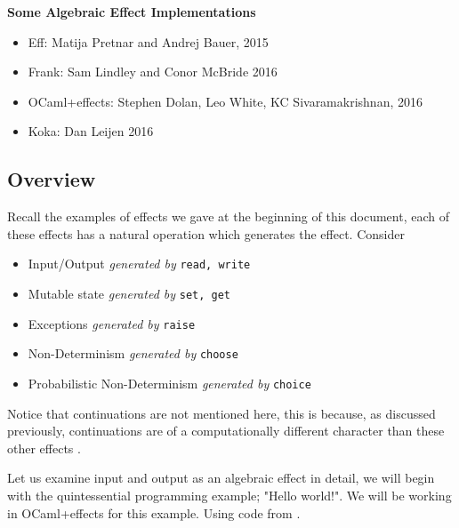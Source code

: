 \textbf{Some Algebraic Effect Implementations}
\begin{itemize}
    \item Eff: Matija Pretnar and Andrej Bauer,
        2015\cite{bauer2015programming}
    \item Frank: Sam Lindley and Conor McBride
        2016\cite{Lindley:2016vz}
    \item OCaml+effects: Stephen Dolan, Leo White, KC Sivaramakrishnan,
        2016\cite{ocamlplseff}
    \item Koka: Dan Leijen
        2016\cite{leijen:16}
\end{itemize}

\subsection{Overview}
\begin{example}
    Recall the examples of effects we gave at the beginning of this document,
    each of these effects has a natural operation which generates the effect.
    Consider
    \begin{itemize}
        \item Input/Output \textit{generated by} \texttt{read, write}
        \item Mutable state \textit{generated by} \texttt{set, get}
        \item Exceptions \textit{generated by} \texttt{raise}
        \item Non-Determinism \textit{generated by} \texttt{choose}
        \item Probabilistic Non-Determinism \textit{generated by} \texttt{choice}
    \end{itemize}
\end{example}

Notice that continuations are not mentioned here,
this is because, as discussed previously,
continuations are of a computationally different character
than these other effects
\cite{Plotkin:2002dw}\cite{hyland2007combining}.

Let us examine input and output as an algebraic effect in detail,
we will begin with the quintessential programming example; "Hello world!".
We will be working in OCaml+effects \cite{ocamlplseff} for this example.
Using code from \cite{kceff}.\\


